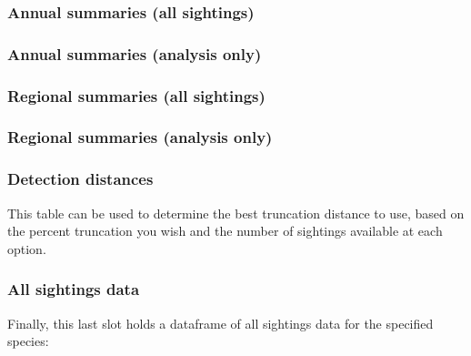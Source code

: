 \documentclass[
]{book}
\begin{document}
\hypertarget{annual-summaries-all-sightings}{%
\subsubsection*{Annual summaries (all sightings)}\label{annual-summaries-all-sightings}}

\hypertarget{annual-summaries-analysis-only}{%
\subsubsection*{Annual summaries (analysis only)}\label{annual-summaries-analysis-only}}

\hypertarget{regional-summaries-all-sightings}{%
\subsubsection*{Regional summaries (all sightings)}\label{regional-summaries-all-sightings}}

\hypertarget{regional-summaries-analysis-only}{%
\subsubsection*{Regional summaries (analysis only)}\label{regional-summaries-analysis-only}}

\hypertarget{detection-distances}{%
\subsubsection*{Detection distances}\label{detection-distances}}

This table can be used to determine the best truncation distance to use, based on the
percent truncation you wish and the number of sightings available at each option.

\hypertarget{all-sightings-data}{%
\subsubsection*{All sightings data}\label{all-sightings-data}}

Finally, this last slot holds a dataframe of all sightings data for the specified species:
\end{document}
